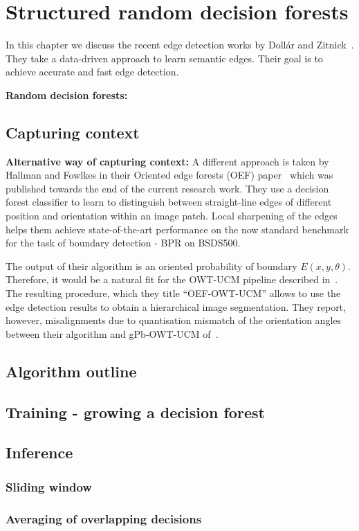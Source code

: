 \chapter{Structured random decision forests}
\label{Chapter2}
In this chapter we discuss the recent edge detection works by Doll\'ar and Zitnick~\cite{DollarICCV13edges,Dollar2014fast}. They take a data-driven approach to learn semantic edges. %
Their goal is to achieve accurate and fast edge detection. %

\textbf{Random decision forests:}

\section{Capturing context}
\textbf{Alternative way of capturing context:} A different approach is taken by Hallman and Fowlkes in their Oriented edge forests (OEF) paper~\cite{Hallman2014} which was published towards the end of the current research work. They use a decision forest classifier to learn to distinguish between straight-line edges of different position and orientation within an image patch. Local sharpening of the edges helps them achieve state-of-the-art performance on the now standard benchmark for the task of boundary detection - BPR on BSDS500.

The output of their algorithm is an oriented probability of boundary $E(x,y,\theta)$. Therefore, it would be a natural fit for the OWT-UCM pipeline described in~\cite{Arbelaez11}. The resulting procedure, which they title ``OEF-OWT-UCM'' allows to use the edge detection results to obtain a hierarchical image segmentation. They report, however, misalignments due to quantisation mismatch of the orientation angles between their algorithm and gPb-OWT-UCM of~\cite{Arbelaez11}.

\section{Algorithm outline}
\section{Training - growing a decision forest}
\section{Inference}
\subsection{Sliding window}
\subsection{Averaging of overlapping decisions}
